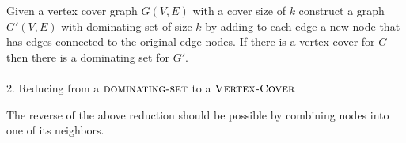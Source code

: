 \documentclass{article}
\begin{document}
\begin{empfile}
Given a vertex cover graph $G(V,E)$ with a cover size of $k$
construct a graph $G'(V,E)$ with dominating set of size $k$
by adding to each edge a new node that has edges connected 
to the original edge nodes. If there is a vertex cover for $G$
then there is a dominating set for $G'$. \\ \ \\


2. Reducing from a $\textsc{dominating-set}$ to a $\textsc{Vertex-Cover}$

The reverse of the above reduction should be possible by 
combining nodes into one of its neighbors.








\end{empfile}
\immediate{}
\end{document}
